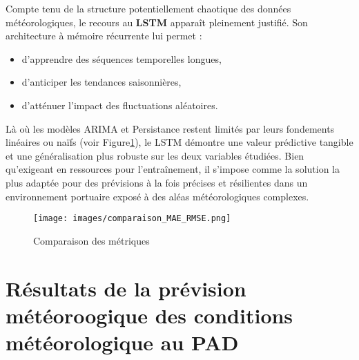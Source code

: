 \documentclass[a4paper,12pt,openany]{report}
\begin{document}
\quad Compte tenu de la structure potentiellement chaotique des données météorologiques, le recours au \textbf{LSTM} apparaît pleinement justifié. Son architecture à mémoire récurrente lui permet :
\begin{itemize}
	\item d’apprendre des séquences temporelles longues,
	\item d’anticiper les tendances saisonnières,
	\item d’atténuer l’impact des fluctuations aléatoires.
\end{itemize}

\quad Là où les modèles ARIMA et Persistance restent limités par leurs fondements linéaires ou naïfs (voir Figure\ref{Fig 3.6}), le LSTM démontre une valeur prédictive tangible et une généralisation plus robuste sur les deux variables étudiées. Bien qu’exigeant en ressources pour l’entraînement, il s’impose comme la solution la plus adaptée pour des prévisions à la fois précises et résilientes dans un environnement portuaire exposé à des aléas météorologiques complexes.
	\begin{figure}[H]
		\begin{center}
		 \begin{minipage}{\textwidth}
		    \begin{center}
		    \texttt{[image: images/comparaison\_MAE\_RMSE.png]}
		    \end{center}
		    \end{minipage}
				
			\caption{Comparaison des métriques\label{Fig 3.6}}
		\end{center}
	\end{figure}%
\section{Résultats de la prévision météoroogique des conditions météorologique au PAD}
	
\end{document}
